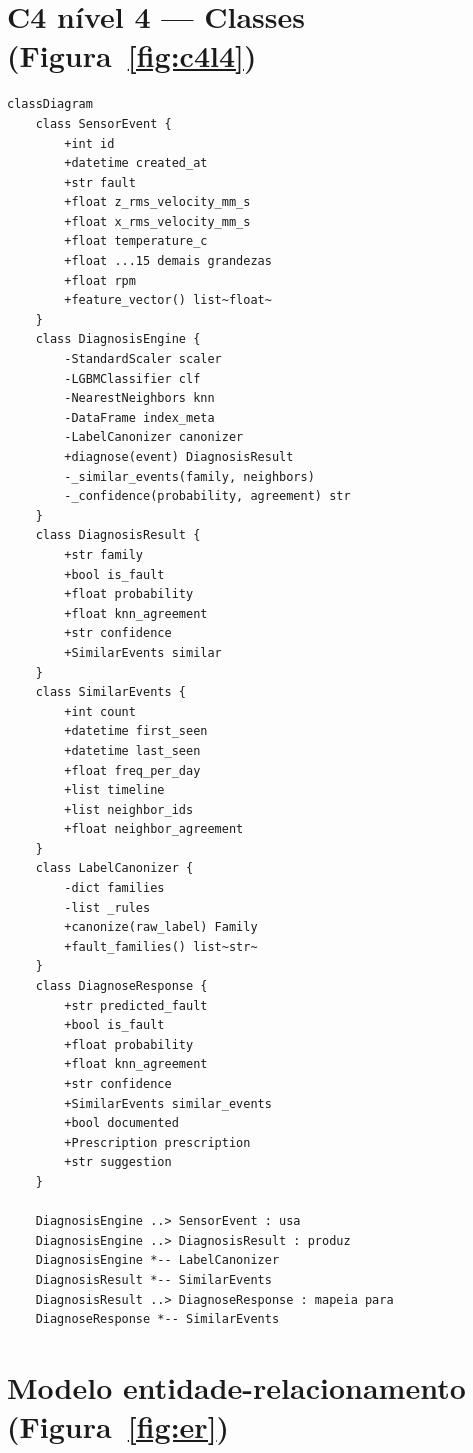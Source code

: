 \section{C4 nível 4 --- Classes (Figura~\ref{fig:c4l4})}

\begin{lstlisting}[language=mermaid, caption={C4 nível 4 --- classes do motor de diagnóstico}, label={lst:mmc4l4}]
classDiagram
    class SensorEvent {
        +int id
        +datetime created_at
        +str fault
        +float z_rms_velocity_mm_s
        +float x_rms_velocity_mm_s
        +float temperature_c
        +float ...15 demais grandezas
        +float rpm
        +feature_vector() list~float~
    }
    class DiagnosisEngine {
        -StandardScaler scaler
        -LGBMClassifier clf
        -NearestNeighbors knn
        -DataFrame index_meta
        -LabelCanonizer canonizer
        +diagnose(event) DiagnosisResult
        -_similar_events(family, neighbors)
        -_confidence(probability, agreement) str
    }
    class DiagnosisResult {
        +str family
        +bool is_fault
        +float probability
        +float knn_agreement
        +str confidence
        +SimilarEvents similar
    }
    class SimilarEvents {
        +int count
        +datetime first_seen
        +datetime last_seen
        +float freq_per_day
        +list timeline
        +list neighbor_ids
        +float neighbor_agreement
    }
    class LabelCanonizer {
        -dict families
        -list _rules
        +canonize(raw_label) Family
        +fault_families() list~str~
    }
    class DiagnoseResponse {
        +str predicted_fault
        +bool is_fault
        +float probability
        +float knn_agreement
        +str confidence
        +SimilarEvents similar_events
        +bool documented
        +Prescription prescription
        +str suggestion
    }

    DiagnosisEngine ..> SensorEvent : usa
    DiagnosisEngine ..> DiagnosisResult : produz
    DiagnosisEngine *-- LabelCanonizer
    DiagnosisResult *-- SimilarEvents
    DiagnosisResult ..> DiagnoseResponse : mapeia para
    DiagnoseResponse *-- SimilarEvents
\end{lstlisting}

\section{Modelo entidade-relacionamento (Figura~\ref{fig:er})}

